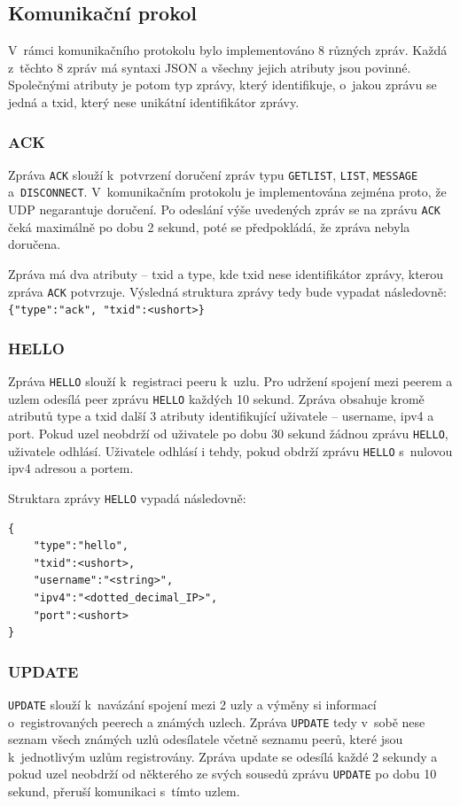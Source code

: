 \documentclass[11pt,a4paper,titlepage]{article}
\begin{document}
        \subsection{Komunikační prokol}
            V~rámci komunikačního protokolu bylo implementováno 8 různých zpráv. Každá z~těchto 8 zpráv má syntaxi
            JSON a všechny jejich atributy jsou povinné. Společnými atributy je potom typ zprávy, který identifikuje,
            o~jakou zprávu se jedná a txid, který nese unikátní identifikátor zprávy.

            \subsubsection{ACK}
                Zpráva \texttt{ACK} slouží k~potvrzení doručení zpráv typu \texttt{GETLIST}, \texttt{LIST}, \texttt{MESSAGE} a~\texttt{DISCONNECT}.
                V~komunikačním protokolu je implementována zejména proto, že UDP negarantuje doručení. Po odeslání výše uvedených zpráv
                se na zprávu \texttt{ACK} čeká maximálně po dobu 2 sekund, poté se předpokládá, že zpráva nebyla doručena.

                Zpráva má dva atributy -- txid a type, kde txid nese identifikátor zprávy, kterou zpráva \texttt{ACK} potvrzuje.
                Výsledná struktura zprávy tedy bude vypadat následovně: \verb+{"type":"ack", "txid":<ushort>}+

            \subsubsection{HELLO}
                Zpráva \texttt{HELLO} slouží k~registraci peeru k~uzlu. Pro udržení spojení mezi peerem a uzlem odesílá peer zprávu
                \texttt{HELLO} každých 10 sekund. Zpráva obsahuje kromě atributů type a txid další 3 atributy identifikující
                uživatele -- username, ipv4 a port. Pokud uzel neobdrží od uživatele po dobu 30 sekund žádnou zprávu \texttt{HELLO},
                uživatele odhlásí. Uživatele odhlásí i tehdy, pokud obdrží zprávu \texttt{HELLO} s~nulovou ipv4 adresou a portem.

                Struktara zprávy \texttt{HELLO} vypadá následovně:
\begin{verbatim}
{
    "type":"hello",
    "txid":<ushort>,
    "username":"<string>",
    "ipv4":"<dotted_decimal_IP>",
    "port":<ushort>
}
\end{verbatim}

            \subsubsection{UPDATE}
                \texttt{UPDATE} slouží k~navázání spojení mezi 2 uzly a výměny si informací o~registrovaných peerech a známých uzlech. Zpráva
                \texttt{UPDATE} tedy v~sobě nese seznam všech známých uzlů odesílatele včetně seznamu peerů, které jsou k~jednotlivým uzlům
                registrovány. Zpráva update se odesílá každé 2 sekundy a pokud uzel neobdrží od některého ze svých sousedů zprávu \texttt{UPDATE}
                po dobu 10 sekund, přeruší komunikaci s~tímto uzlem.
\end{document}
